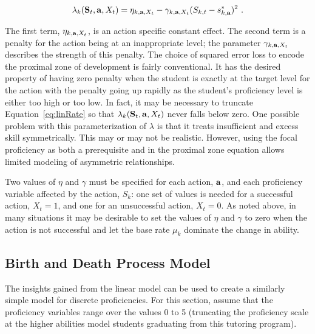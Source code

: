 \documentclass[12pt]{RR-article}
\begin{document}
\begin{equation}
\label{eq:linRate}
\lambda_{k}({\bf S}_t,{\bf a}, X_t) = \eta_{k,{\bf a},X_t} - \gamma_{k,{\bf a},X_t}
(S_{k,t}-s^*_{k,{\bf a}})^2 \ .
\end{equation}

The first term, $\eta_{k,{\bf a},X_t}$, is an action specific constant
effect.  The second term is a penalty for the action being at an
inappropriate level; the parameter $\gamma_{k,{\bf a},X_t}$ describes the
strength of this penalty.  The choice of squared error loss to
encode the proximal zone of development is fairly conventional.  It
has the desired property of having zero penalty when the student is
exactly at the target level for the action with the penalty going up
rapidly as the student's proficiency level is either too high or too
low.  In fact, it may be necessary to truncate
Equation~\ref{eq:linRate} so that $\lambda_{k}({\bf S}_t, {\bf a}, X_t)$
never falls below zero.  One possible problem with this
parameterization of $\lambda$ is that it treats
insufficient and excess skill symmetrically.  This may or may not be
realistic.  However, using the focal proficiency as both a prerequisite and in
the proximal zone equation allows limited modeling of asymmetric
relationships.

Two values of $\eta$ and $\gamma$ must be specified for each action,
${\bf a}$, and each proficiency variable affected by the action,
$S_k$:  one set of values is needed for a successful action, $X_t=1$,
and one for an unsuccessful action, $X_t=0$.  As noted above, in many
situations it may be desirable to set the values of $\eta$ and
$\gamma$ to zero when the action is not successful and let the base
rate $\mu_k$ dominate the change in ability.

\subsection{Birth and Death Process Model}
\label{sect:Birth}

The insights gained from the linear model can be used to create a
similarly simple model for discrete proficiencies.  For this section,
assume that the proficiency variables range over the values 0 to
5  (truncating the
proficiency scale at the higher abilities model students graduating
from this tutoring program).  
\end{document}
